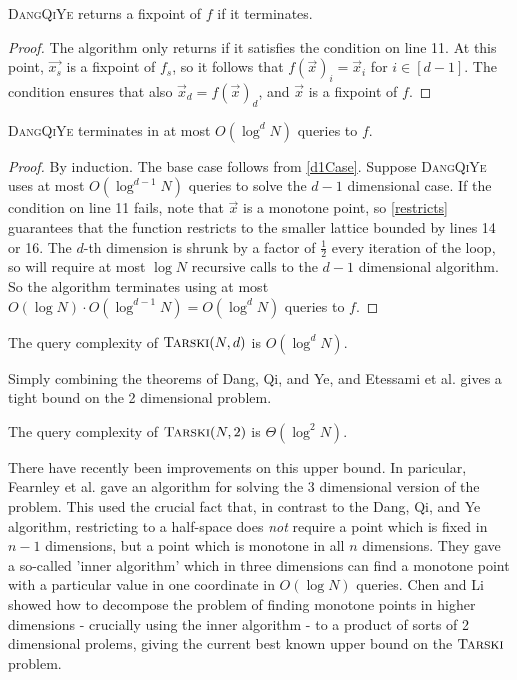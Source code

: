 \begin{lemma}
  \textsc{DangQiYe} returns a fixpoint of $f$ if it terminates.
\end{lemma}
\begin{proof}
  The algorithm only returns if it satisfies the condition on line 11. At this point, $\vec{x_s}$ is a fixpoint
  of $f_s$, so it follows that $f(\vec{x})_i = \vec{x}_i$ for $i \in [d-1]$. The condition ensures
  that also $\vec{x}_d = f(\vec{x})_d$, and $\vec{x}$ is a fixpoint of $f$.
\end{proof}
\begin{lemma}
  \textsc{DangQiYe} terminates in at most $O(\log^d N)$ queries to $f$.
\end{lemma}
\begin{proof}
  By induction. The base case follows from \cref{d1Case}. Suppose \textsc{DangQiYe} uses at most
  $O(\log^{d-1}N)$ queries to solve the $d-1$ dimensional case. If the condition
  on line 11 fails, note that $\vec{x}$ is a monotone point, so \cref{restricts} guarantees
  that the function restricts to the smaller lattice bounded by lines 14 or 16.
  The $d$-th dimension is shrunk by a factor of $\frac{1}{2}$ every iteration of the loop,
  so will require at most $\log N$ recursive calls to the $d-1$ dimensional algorithm.
  So the algorithm terminates using at most $O(\log N) \cdot O(\log^{d-1} N) = O(\log^d N)$ queries to $f$.
\end{proof}
\begin{theorem}
  The query complexity of $\textsc{Tarski}(N, d)$ is $O(\log^d N)$.
\end{theorem}
Simply combining the theorems of Dang, Qi, and Ye, and Etessami et al. gives a tight
bound on the 2 dimensional problem.
\begin{cor}
  The query complexity of $\textsc{Tarski}(N, 2)$ is $\Theta(\log^2 N)$.
\end{cor}
There have recently been improvements on this upper bound. In paricular,
Fearnley et al. gave an algorithm for solving the 3 dimensional version
of the problem. This used the crucial fact that, in contrast to the
Dang, Qi, and Ye algorithm, restricting to a half-space does \emph{not} require
a point which is fixed in $n-1$ dimensions, but a point which is monotone
in all $n$ dimensions. They gave a so-called 'inner algorithm'
which in three dimensions can find a monotone point with a particular
value in one coordinate in $O(\log N)$ queries. Chen and Li showed
how to decompose the problem of finding monotone
points in higher dimensions - crucially using the inner algorithm - to a product of sorts of 2 dimensional
prolems, giving the current best known upper bound on the $\textsc{Tarski}$ problem.

